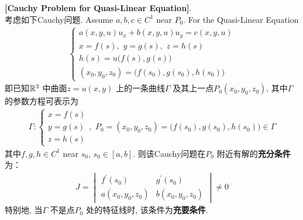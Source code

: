	\newpage
	
	\begin{thm}\label{thm 1.3.1}
		\textbf{[Cauchy Problem for Quasi-Linear Equation]}. \\
		考虑如下Cauchy问题. Assume $a , b , c \in C^1$ near $P_0$. For the Quasi-Linear Equation
		\begin{align*}
			\begin{cases}
				a(x , y , u) u_x + b(x , y , u) u_y = c(x , y , u) \\
				x = f(s) , \,\, y = g(s) , \,\, z = h(s) \\
				h(s) = u \Big( f(s) , g(s) \Big) \\
				(x_0 , y_0 , z_0) = \Big( f(s_0) , g(s_0) , h(s_0) \Big)
			\end{cases}
		\end{align*}
		即已知$\mathbb{R}^3$ 中曲面$z = u(x , y)$ 上的一条曲线$\Gamma$ 及其上一点$P_0(x_0 , y_0 , z_0)$, 其中$\Gamma$ 的参数方程可表示为
		\begin{align*}
			\Gamma : 
			\begin{cases}
				x = f(s) \\
				y = g(s) \\
				z = h(s)
			\end{cases} , \,\, P_0 = (x_0 , y_0 , z_0) = \Big( f(s_0) , g(s_0) , h(s_0) \Big) \in \Gamma
		\end{align*}
		其中$f , g , h \in C^{1}$ near $s_0$, $s_0 \in [a , b]$. 则该Cauchy问题在$P_0$ 附近有解的\textbf{充分条件}为：
		\begin{align*}
			J = 
			\begin{vmatrix}
				f^{'}(s_0) &g^{'}(s_0) \\
				a(x_0 , y_0 , z_0) &b(x_0 , y_0 , z_0)
			\end{vmatrix}
			\neq 0
		\end{align*}
		特别地, 当$\Gamma$ 不是点$P_0$ 处的特征线时, 该条件为\textbf{充要条件}. 
		
		\vspace*{8em}
		

\end{thm}
